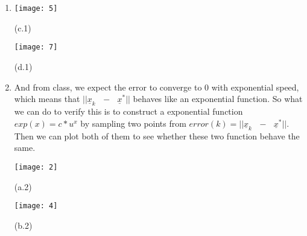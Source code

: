 \documentclass[11pt,letterpaper]{article}
\begin{document}
\newpage
\begin{tcolorbox}
    \begin{enumerate}[\quad\quad]
        \item 
        \begin{minipage}{0.4\textwidth}
            \texttt{[image: 5]}
            \begin{center}
                (c.1)
            \end{center}
        \end{minipage}
        \begin{minipage}{0.1\textwidth}
            \begin{center}
                
            \end{center}
        \end{minipage}
        \begin{minipage}{0.4\textwidth}
                \texttt{[image: 7]}
                \begin{center}
                (d.1)
                \end{center}
        \end{minipage}
        \item And from class, we expect the error to converge to $0$ with exponential speed, which means that ${||}\underline x_k \text{ $-$ } \underline x^{*} {||}$ behaves like an exponential function. So what we can do to verify this is to construct a exponential function $exp(x) = c * u^x$ by sampling two points from $error(k) = {||}\underline x_k \text{ $-$ } \underline x^{*} {||}$. Then we can plot both of them to see whether these two function behave the same.
        \begin{minipage}{0.4\textwidth}
            \texttt{[image: 2]}
            \begin{center}
                (a.2)
            \end{center}
        \end{minipage}
        \begin{minipage}{0.1\textwidth}
            \begin{center}
                
            \end{center}
        \end{minipage}
        \begin{minipage}{0.4\textwidth}
                \texttt{[image: 4]}
                \begin{center}
                (b.2)
                \end{center}
        \end{minipage}


\end{enumerate}
\end{tcolorbox}
\end{document}

